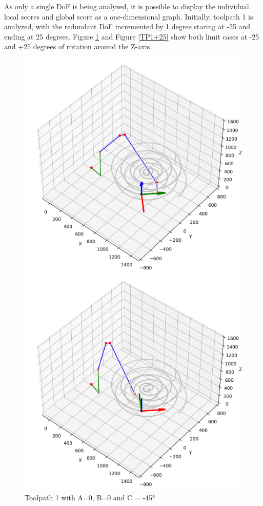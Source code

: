 As only a single DoF is being analyzed, it is possible to display the individual local scores and global score as a one-dimensional graph. Initially, toolpath 1 is analyzed, with the redundant DoF incremented by 1 degree staring at -25 and ending at 25 degrees. 
Figure \ref{TP1-25} and Figure \ref{TP1+25} show both limit cases at -25 and +25 degrees of rotation around the Z-axis.

\begin{figure}[H]
	\centering
	\begin{minipage}{0.5\textwidth}
		\includegraphics[width=\textwidth]{figures/robotANDpath1_-45.png}
		\caption{Toolpath 1 with A=0, B=0 and C = -45°}
		\label{TP1-25}
	\end{minipage}\hfill
	\begin{minipage}{0.5\textwidth}
		\includegraphics[width=\textwidth]{figures/robotANDpath1_45.png}

\end{minipage}
\end{figure}

